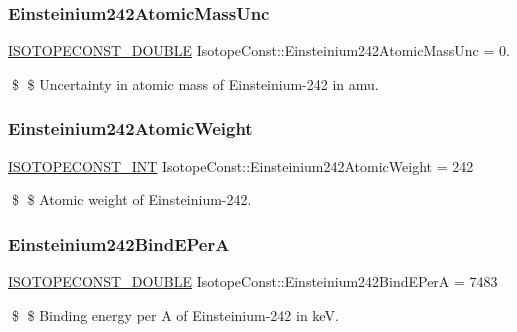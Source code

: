 \subsubsection{\texorpdfstring{Einsteinium242\+Atomic\+Mass\+Unc}{Einsteinium242AtomicMassUnc}}
{\footnotesize\ttfamily \mbox{\hyperlink{group___isotope_const-_macros_ga8f45a7272ce02c0b4c65c44636ed719a}{I\+S\+O\+T\+O\+P\+E\+C\+O\+N\+S\+T\+\_\+\+D\+O\+U\+B\+LE}} Isotope\+Const\+::\+Einsteinium242\+Atomic\+Mass\+Unc = 0.}

\$ \$ Uncertainty in atomic mass of Einsteinium-\/242 in amu. \mbox{\label{group___isotope_const-_einsteinium-_es242_gaccca6273134468814b976878c7b56a44}} 
\subsubsection{\texorpdfstring{Einsteinium242\+Atomic\+Weight}{Einsteinium242AtomicWeight}}
{\footnotesize\ttfamily \mbox{\hyperlink{group___isotope_const-_macros_ga5f18360b3e99483a35c32d789e62621c}{I\+S\+O\+T\+O\+P\+E\+C\+O\+N\+S\+T\+\_\+\+I\+NT}} Isotope\+Const\+::\+Einsteinium242\+Atomic\+Weight = 242}

\$ \$ Atomic weight of Einsteinium-\/242. \mbox{\label{group___isotope_const-_einsteinium-_es242_ga9fdf34c9b4aed9333bddad64c33621fa}} 
\subsubsection{\texorpdfstring{Einsteinium242\+Bind\+E\+PerA}{Einsteinium242BindEPerA}}
{\footnotesize\ttfamily \mbox{\hyperlink{group___isotope_const-_macros_ga8f45a7272ce02c0b4c65c44636ed719a}{I\+S\+O\+T\+O\+P\+E\+C\+O\+N\+S\+T\+\_\+\+D\+O\+U\+B\+LE}} Isotope\+Const\+::\+Einsteinium242\+Bind\+E\+PerA = 7483}

\$ \$ Binding energy per A of Einsteinium-\/242 in keV. \mbox{\label{group___isotope_const-_einsteinium-_es242_ga8fe9af28bd839ce0b416d7084ef096a6}} 
